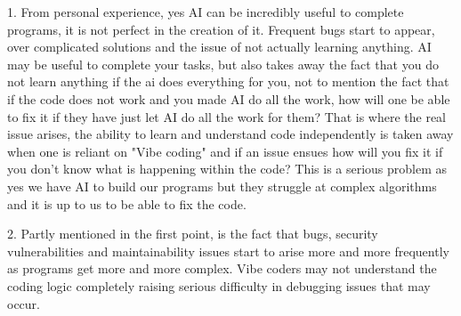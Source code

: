 \documentclass{article}
\begin{document}
1. From personal experience, yes AI can be incredibly useful to complete programs, it is not perfect in the creation of it. Frequent bugs start to appear, over complicated solutions and the issue of not actually learning anything. AI may be useful to complete your tasks, but also takes away the fact that you do not learn anything if the ai does everything for you, not to mention the fact that if the code does not work and you made AI do all the work, how will one be able to fix it if they have just let AI do all the work for them? That is where the real issue arises, the ability to learn and understand code independently is taken away when one is reliant on "Vibe coding" and if an issue ensues how will you fix it if you don't know what is happening within the code? This is a serious problem as yes we have AI to build our programs but they struggle at complex algorithms and it is up to us to be able to fix the code.

2. Partly mentioned in the first point, is the fact that bugs, security vulnerabilities and maintainability issues start to arise more and more frequently as programs get more and more complex. Vibe coders may not understand the coding logic completely raising serious difficulty in debugging issues that may occur.

\nocite{*}


\end{document}
